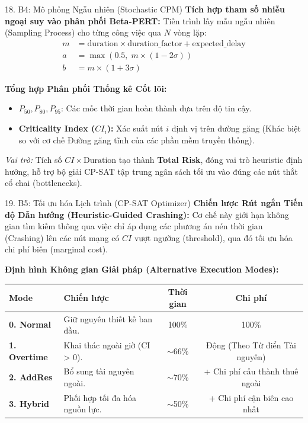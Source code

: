 \begin{frame}{18. B4: Mô phỏng Ngẫu nhiên (Stochastic CPM)}
    \textbf{Tích hợp tham số nhiễu ngoại suy vào phân phối Beta-PERT:}
    Tiến trình lấy mẫu ngẫu nhiên (Sampling Process) cho từng công việc qua $N$ vòng lặp:
    \begin{align}
        m &= \text{duration} \times \text{duration\_factor} + \text{expected\_delay} \\
        a &= \max(0.5, \; m \times (1 - 2\sigma)) \\
        b &= m \times (1 + 3\sigma)
    \end{align}
    
    \vspace{0.2cm}
    \textbf{Tổng hợp Phân phối Thống kê Cốt lõi:}
    \begin{itemize}
        \item $P_{50}, P_{80}, P_{95}$: Các mốc thời gian hoàn thành dựa trên độ tin cậy.
        \item \textbf{Criticality Index ($CI_i$):} Xác suất nút $i$ định vị trên đường găng (Khác biệt so với cơ chế Đường găng tĩnh của các phần mềm truyền thống).
    \end{itemize}
    \textit{Vai trò:} Tích số $CI \times \text{Duration}$ tạo thành \textbf{Total Risk}, đóng vai trò heuristic định hướng, hỗ trợ bộ giải CP-SAT tập trung ngân sách tối ưu vào đúng các nút thắt cổ chai (bottlenecks).
\end{frame}

\begin{frame}{19. B5: Tối ưu hóa Lịch trình (CP-SAT Optimizer)}
    \textbf{Chiến lược Rút ngắn Tiến độ Dẫn hướng (Heuristic-Guided Crashing):}
    Cơ chế này giới hạn không gian tìm kiếm thông qua việc chỉ áp dụng các phương án nén thời gian (Crashing) lên các nút mạng có $CI$ vượt ngưỡng (threshold), qua đó tối ưu hóa chi phí biên (marginal cost).
    
    \vspace{0.2cm}
    \textbf{Định hình Không gian Giải pháp (Alternative Execution Modes):}
    \begin{table}
        \centering
        \footnotesize
        \begin{tabular}{@{}llcc@{}}
            \toprule
            \textbf{Mode} & \textbf{Chiến lược} & \textbf{Thời gian} & \textbf{Chi phí} \\
            \midrule
            \textbf{0. Normal} & Giữ nguyên thiết kế ban đầu. & 100\% & 100\% \\
            \textbf{1. Overtime} & Khai thác ngoài giờ (CI > 0). & $\sim$66\% & Động (Theo Từ điển Tài nguyên) \\
            \textbf{2. AddRes} & Bổ sung tài nguyên ngoài. & $\sim$70\% & + Chi phí cấu thành thuê ngoài \\
            \textbf{3. Hybrid} & Phối hợp tối đa hóa nguồn lực. & $\sim$50\% & + Chi phí cận biên cao nhất \\
            \bottomrule
        \end{tabular}
    \end{table}
\end{frame}

